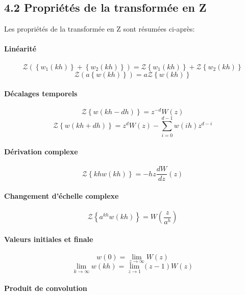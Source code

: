 \documentclass[11pt]{article}
\begin{document}
    \subsection{4.2 Propriétés de la transformée en
Z}\label{propriuxe9tuxe9s-de-la-transformuxe9e-en-z}

    Les propriétés de la transformée en Z sont résumées ci-après:

\paragraph{Linéarité}\label{linuxe9arituxe9}

\[ \mathscr{Z}\left(\left\{w_1(kh)\right\}+\left\{w_2(kh)\right\}\right) = \mathscr{Z}\left\{w_1(kh)\right\}+\mathscr{Z}\left\{w_2(kh)\right\} \]
\[ \mathscr{Z}\left(a\left\{w(kh)\right\}\right) = a\mathscr{Z}\left\{w(kh)\right\} \]

\paragraph{Décalages temporels}\label{duxe9calages-temporels}

\[ \mathscr{Z}\left\{w(kh-dh)\right\} = z^{-d}W(z) \]
\[ \mathscr{Z}\left\{w(kh+dh)\right\} = z^{d}W(z) - \sum_{i=0}^{d-1}w(ih)z^{d-i} \]

\paragraph{Dérivation complexe}\label{duxe9rivation-complexe}

\[ \mathscr{Z}\left\{khw(kh)\right\} = -hz\frac{dW}{dz}(z) \]

\paragraph{Changement d'échelle
complexe}\label{changement-duxe9chelle-complexe}

\[ \mathscr{Z}\left\{a^{kh}w(kh)\right\} = W\left(\frac{z}{a^h}\right) \]

\paragraph{Valeurs initiales et
finale}\label{valeurs-initiales-et-finale}

\[ w(0) = \lim_{z \rightarrow \infty}W(z) \]
\[ \lim_{k \rightarrow \infty} w(kh) = \lim_{z \rightarrow 1}(z-1)W(z) \]

\paragraph{Produit de convolution}\label{produit-de-convolution}
\end{document}
